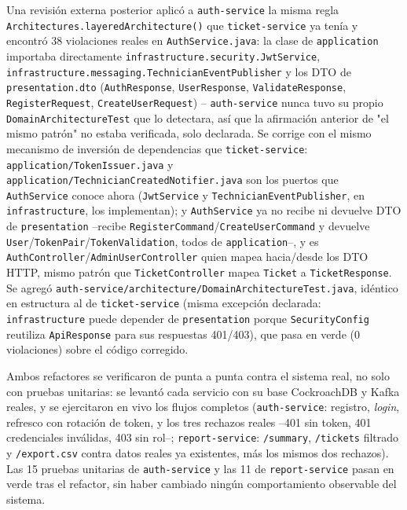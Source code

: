 Una revisión externa posterior aplicó a \texttt{auth-service} la misma regla
\texttt{Architectures.layeredArchitecture()} que \texttt{ticket-service} ya tenía y encontró 38
violaciones reales en \texttt{AuthService.java}: la clase de \texttt{application} importaba
directamente \texttt{infrastructure.security.JwtService},
\texttt{infrastructure.messaging.TechnicianEventPublisher} y los DTO de
\texttt{presentation.dto} (\texttt{AuthResponse}, \texttt{UserResponse},
\texttt{ValidateResponse}, \texttt{RegisterRequest}, \texttt{CreateUserRequest}) --
\texttt{auth-service} nunca tuvo su propio \texttt{DomainArchitectureTest} que lo detectara, así
que la afirmación anterior de "el mismo patrón" no estaba verificada, solo declarada. Se corrige
con el mismo mecanismo de inversión de dependencias que \texttt{ticket-service}:
\texttt{application/TokenIssuer.java} y \texttt{application/TechnicianCreatedNotifier.java} son
los puertos que \texttt{AuthService} conoce ahora (\texttt{JwtService} y
\texttt{TechnicianEventPublisher}, en \texttt{infrastructure}, los implementan); y
\texttt{AuthService} ya no recibe ni devuelve DTO de \texttt{presentation} --recibe
\texttt{RegisterCommand}/\texttt{CreateUserCommand} y devuelve
\texttt{User}/\texttt{TokenPair}/\texttt{TokenValidation}, todos de \texttt{application}--, y es
\texttt{AuthController}/\texttt{AdminUserController} quien mapea hacia/desde los DTO HTTP, mismo
patrón que \texttt{TicketController} mapea \texttt{Ticket} a \texttt{TicketResponse}. Se agregó
\texttt{auth-service/architecture/DomainArchitectureTest.java}, idéntico en estructura al de
\texttt{ticket-service} (misma excepción declarada: \texttt{infrastructure} puede depender de
\texttt{presentation} porque \texttt{SecurityConfig} reutiliza \texttt{ApiResponse} para sus
respuestas 401/403), que pasa en verde (0 violaciones) sobre el código corregido.

Ambos refactores se verificaron de punta a punta contra el sistema real, no solo con pruebas
unitarias: se levantó cada servicio con su base CockroachDB y Kafka reales, y se ejercitaron en
vivo los flujos completos (\texttt{auth-service}: registro, \emph{login}, refresco con rotación
de token, y los tres rechazos reales --401 sin token, 401 credenciales inválidas, 403 sin rol--;
\texttt{report-service}: \texttt{/summary}, \texttt{/tickets} filtrado y \texttt{/export.csv}
contra datos reales ya existentes, más los mismos dos rechazos). Las 15 pruebas unitarias de
\texttt{auth-service} y las 11 de \texttt{report-service} pasan en verde tras el refactor, sin
haber cambiado ningún comportamiento observable del sistema.

